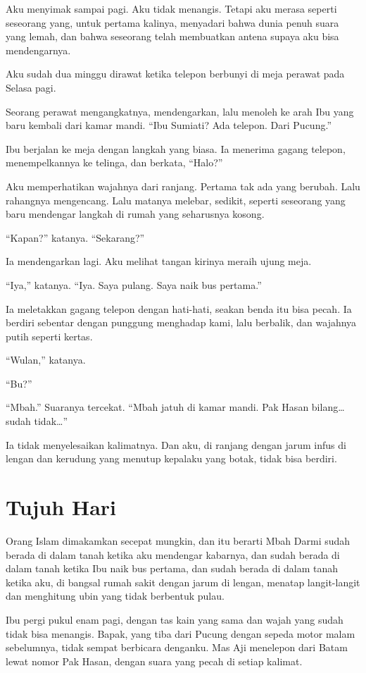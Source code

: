 \documentclass[11pt,twoside,openany]{book}
\makeatletter
\newcommand{\scenebreak}{\par\vspace{0.9em}{\centering\textsc{*\hspace{0.7em}*\hspace{0.7em}*}\par}\vspace{0.9em}\@afterindentfalse\@afterheading}
\makeatother
\begin{document}
Aku menyimak sampai pagi. Aku tidak menangis. Tetapi aku merasa seperti seseorang yang, untuk pertama kalinya, menyadari bahwa dunia penuh suara yang lemah, dan bahwa seseorang telah membuatkan antena supaya aku bisa mendengarnya.

\scenebreak
Aku sudah dua minggu dirawat ketika telepon berbunyi di meja perawat pada Selasa pagi.

Seorang perawat mengangkatnya, mendengarkan, lalu menoleh ke arah Ibu yang baru kembali dari kamar mandi. ``Ibu Sumiati? Ada telepon. Dari Pucung.''

Ibu berjalan ke meja dengan langkah yang biasa. Ia menerima gagang telepon, menempelkannya ke telinga, dan berkata, ``Halo?''

Aku memperhatikan wajahnya dari ranjang. Pertama tak ada yang berubah. Lalu rahangnya mengencang. Lalu matanya melebar, sedikit, seperti seseorang yang baru mendengar langkah di rumah yang seharusnya kosong.

``Kapan?'' katanya. ``Sekarang?''

Ia mendengarkan lagi. Aku melihat tangan kirinya meraih ujung meja.

``Iya,'' katanya. ``Iya. Saya pulang. Saya naik bus pertama.''

Ia meletakkan gagang telepon dengan hati-hati, seakan benda itu bisa pecah. Ia berdiri sebentar dengan punggung menghadap kami, lalu berbalik, dan wajahnya putih seperti kertas.

``Wulan,'' katanya.

``Bu?''

``Mbah.'' Suaranya tercekat. ``Mbah jatuh di kamar mandi. Pak Hasan bilang\ldots{} sudah tidak\ldots{}''

Ia tidak menyelesaikan kalimatnya. Dan aku, di ranjang dengan jarum infus di lengan dan kerudung yang menutup kepalaku yang botak, tidak bisa berdiri.

\chapter{Tujuh Hari}
Orang Islam dimakamkan secepat mungkin, dan itu berarti Mbah Darmi sudah berada di dalam tanah ketika aku mendengar kabarnya, dan sudah berada di dalam tanah ketika Ibu naik bus pertama, dan sudah berada di dalam tanah ketika aku, di bangsal rumah sakit dengan jarum di lengan, menatap langit-langit dan menghitung ubin yang tidak berbentuk pulau.

Ibu pergi pukul enam pagi, dengan tas kain yang sama dan wajah yang sudah tidak bisa menangis. Bapak, yang tiba dari Pucung dengan sepeda motor malam sebelumnya, tidak sempat berbicara denganku. Mas Aji menelepon dari Batam lewat nomor Pak Hasan, dengan suara yang pecah di setiap kalimat.
\end{document}

